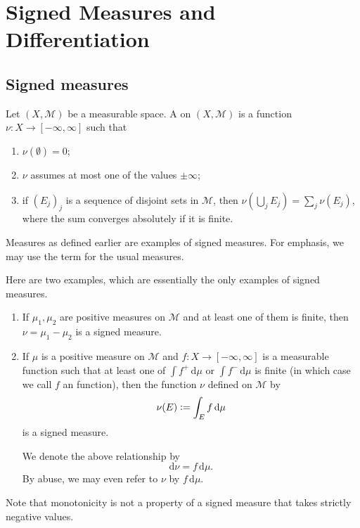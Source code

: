 \documentclass[12pt]{article}	%
\begin{document}
\section{Signed Measures and Differentiation}

\subsection{Signed measures}

\begin{defn}
	Let $(X, \mathcal{M})$ be a measurable space. A  on $(X, \mathcal{M})$ is a function $\nu : X \to [-\infty, \infty]$ such that
	\begin{enumerate}
		\item $\nu(\emptyset) = 0$;
		\item $\nu$ assumes at most one of the values $\pm \infty$;
		\item if $(E_{j})_{j}$ is a sequence of disjoint sets in $\mathcal{M}$, then $\nu(\bigcup_{j} E_{j}) = \sum_{j} \nu(E_{j})$, where the sum converges absolutely if it is finite.
	\end{enumerate}
\end{defn}
Measures as defined earlier are examples of signed measures. For emphasis, we may use the term  for the usual measures.

\begin{ex}
	Here are two examples, which are essentially the only examples of signed measures.
	\begin{enumerate}
		\item If $\mu_{1}, \mu_{2}$ are positive measures on $\mathcal{M}$ and at least one of them is finite, then $\nu = \mu_{1} - \mu_{2}$ is a signed measure.
		\item If $\mu$ is a positive measure on $\mathcal{M}$ and $f : X \to [-\infty, \infty]$ is a measurable function such that at least one of $\int f^{+} \,{\mathrm d}\mu$ or $\int f^{-} \,{\mathrm d}\mu$ is finite (in which case we call $f$ an  function), then the function $\nu$ defined on $\mathcal{M}$ by
		\begin{equation*} 
			\nu(E) \vcentcolon= \int_{E} f \,{\mathrm{d}}\mu
		\end{equation*}
		is a signed measure.

		We denote the above relationship by
		\begin{equation} \label{eq:002}
			{\mathrm d}\nu = f \,{\mathrm d}\mu.
		\end{equation}
		By abuse, we may even refer to $\nu$ by $f \,{\mathrm d}\mu$.
	\end{enumerate}
\end{ex}
\begin{rem}
	Note that monotonicity is not a property of a signed measure that takes strictly negative values.
\end{rem}
\end{document}
